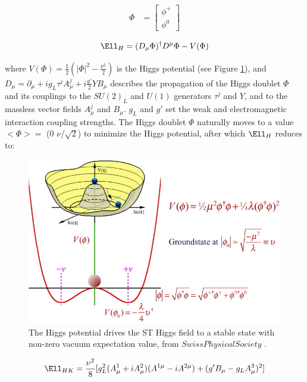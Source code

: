 \begin{align}
	\Phi &= \begin{bmatrix}
	\phi^{+} \\
	\phi^{0}
	\end{bmatrix}
\end{align}

\begin{equation}
	\Ell_{H} = (D_{\mu}\Phi)^{\dagger}D^{\mu}\Phi - V(\Phi)
\end{equation}

where $V(\Phi) = \frac{1}{2}(|\Phi|^{2} - \frac{\nu^{2}}{2})$ is the Higgs potential (see Figure \ref{fig:smHiggsPotential}), and 
$D_{\mu} = \partial_{\mu} + ig_{L}\tau^{j}A^{j}_{\mu} + i\frac{g'}{2}YB_{\mu}$ describes the propagation 
of the Higgs doublet $\Phi$ and its couplings to the $SU(2)_{L}$ and $U(1)$ generators $\tau^{j}$ and $Y$, 
and to the massless vector fields $A^{j}_{\mu}$ and $B_{\mu}$.  $g_{L}$ and 
$g'$ set the weak and electromagnetic interaction coupling strengths.  The Higgs doublet $\Phi$ naturally 
moves to a value $<\Phi> =$ (0  $\nu/\sqrt{2}$) to minimize the Higgs potential, after which $\Ell_{H}$ reduces 
to:

\begin{figure}[h]
	\centering
	\includegraphics[width=1.0\textwidth]{figures/mexicanHatPotential.jpg}
	\caption{The Higgs potential drives the ST Higgs field to a stable state with non-zero vacuum expectation value, from $Swiss Physical Society$ \cite{higgsPotential}.}
	\label{fig:smHiggsPotential}
\end{figure}

\begin{equation}
	\Ell_{HK} = \frac{\nu^{2}}{8}[g^{2}_{L}(A^{1}_{\mu} + iA^{2}_{\mu})(A^{1\mu} - iA^{2\mu}) + (g'B_{\mu} - g_{L}A^{3}_{\mu})^{2}]
\end{equation}

